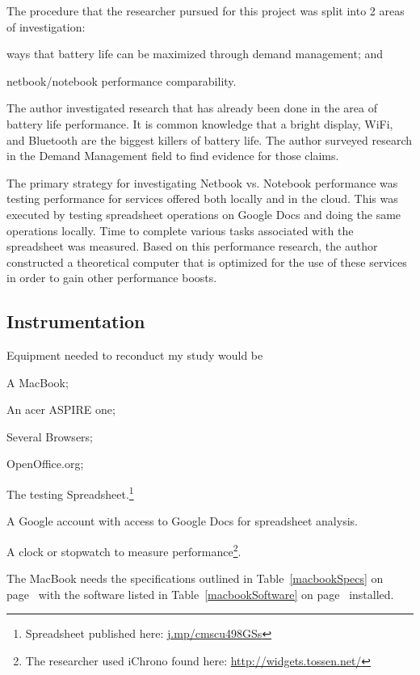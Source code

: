 The procedure that the researcher pursued for this project was split into 2 areas
of investigation:
\begin{inparaenum}[(1)]
\item ways that battery life can be maximized through demand management; and
\item netbook/notebook performance comparability.
\end{inparaenum}

The author investigated research that has already been done in the area of
battery life performance.  It is common knowledge that a bright display, WiFi,
and Bluetooth are the biggest killers of battery life.  The author surveyed
research in the Demand Management field to find evidence for those claims.

The primary strategy for investigating Netbook vs. Notebook performance was
testing performance for services offered both locally and in the cloud.  This
was executed by testing spreadsheet operations on Google Docs and doing the same
operations locally.  Time to complete various tasks associated with the
spreadsheet was measured.  Based on this performance research, the author
constructed a theoretical computer that is optimized for the use of these
services in order to gain other performance boosts.

\subsection{Instrumentation}


Equipment needed to reconduct my study would be
\begin{inparaenum}[(1)]
\item A MacBook;
\item An acer ASPIRE one;
\item Several Browsers;
\item OpenOffice.org;
\item The testing Spreadsheet.\footnote{Spreadsheet published here:
  \url{j.mp/cmscu498GSs}}
\item A Google account with access to Google Docs for spreadsheet analysis.
\item A clock or stopwatch to measure performance\footnote{The researcher used
  iChrono found here: \url{http://widgets.tossen.net/}}.
\end{inparaenum}

The MacBook needs the specifications outlined in Table~\ref{macbookSpecs} on
page~\pageref{macbookSpecs} with the software listed in
Table~\ref{macbookSoftware} on page~\pageref{macbookSoftware} installed.

